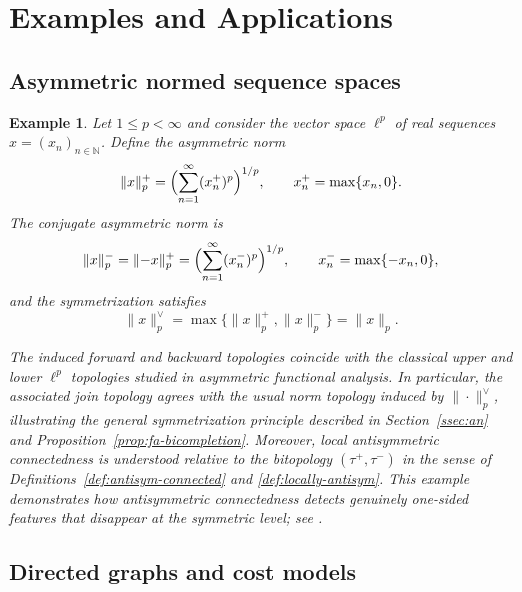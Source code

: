 \documentclass[preprint,12pt]{elsarticle}
\newtheorem{example}[theorem]{Example}
\begin{document}
\section{Examples and Applications}\label{sec:examples-applications}

\subsection{Asymmetric normed sequence spaces}\label{ssec:ex-seq}

\begin{example}
\label{ex:one-sided-lp}
Let $1\le p<\infty$ and consider the vector space $\ell^p$ of real
sequences $x=(x_n)_{n\in\mathbb{N}}$. Define the asymmetric norm
\[
\|x\|_{p}^{+}
=
\Bigl(\sum_{n=1}^{\infty} (x_n^{+})^p\Bigr)^{1/p},
\qquad
x_n^{+}=\max\{x_n,0\}.
\]
The conjugate asymmetric norm is
\[
\|x\|_{p}^{-}=\|{-}x\|_{p}^{+}
=
\Bigl(\sum_{n=1}^{\infty} (x_n^{-})^p\Bigr)^{1/p},
\qquad
x_n^{-}=\max\{-x_n,0\},
\]
and the symmetrization satisfies
\[
\|x\|_{p}^{\vee}
=
\max\{\|x\|_{p}^{+},\|x\|_{p}^{-}\}
=
\|x\|_{p}.
\]

The induced forward and backward topologies coincide with the classical
upper and lower $\ell^p$ topologies studied in asymmetric functional
analysis. In particular, the associated join topology agrees with the
usual norm topology induced by $\|\cdot\|_{p}^{\vee}$, illustrating the
general symmetrization principle described in
Section~\ref{ssec:an} and Proposition~\ref{prop:fa-bicompletion}.
Moreover, local antisymmetric connectedness is understood relative to
the bitopology $(\tau^{+},\tau^{-})$ in the sense of
Definitions~\ref{def:antisym-connected} and \ref{def:locally-antisym}.
This example demonstrates how antisymmetric connectedness detects
genuinely one-sided features that disappear at the symmetric level; see
\cite{Cobzas2013}.
\end{example}


\subsection{Directed graphs and cost models}\label{ssec:ex-graphs}
\end{document}
